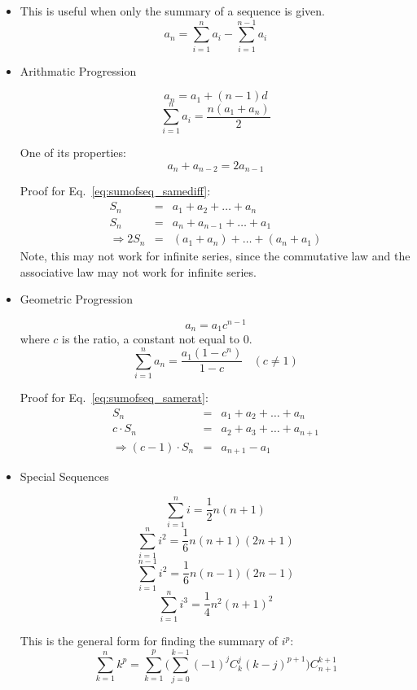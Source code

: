  \begin{itemize}
 \item This is useful when only the summary of a sequence is given.
  \[ a_n = \sum_{i=1}^n a_i - \sum_{i=1}^{n-1} a_i \]

 \item{Arithmatic Progression}

  \[ a_n = a_1 + (n-1) d \]
  \begin{equation}
  \sum_{i=1}^n a_i = \frac{n(a_1+a_n)}{2}
  \label{eq:sumofseq_samediff}
  \end{equation}

  One of its properties:
  \[ a_{n} + a_{n-2} = 2 a_{n-1} \]

  Proof for Eq.~\ref{eq:sumofseq_samediff}:
  \begin{eqnarray}
                S_n & = & a_1 + a_2 + \ldots + a_n \\
                S_n & = & a_n + a_{n-1} + \ldots + a_1 \\
  \Rightarrow 2 S_n & = & (a_1 + a_n) + \ldots + (a_n + a_1)
  \end{eqnarray}
  Note, this may not work for infinite series, since
  the commutative law and the associative law may not
  work for infinite series.
 
 \item{Geometric Progression}

 \[ a_n = a_1 c^{n-1} \]
 where $c$ is the ratio, a constant not equal to $0$.
 \begin{equation}
 \sum_{i=1}^n a_n = \frac{a_1 (1-c^n)}{1-c} ~~~~(c\neq1)
 \label{eq:sumofseq_samerat}
 \end{equation}

 Proof for Eq.~\ref{eq:sumofseq_samerat}:
 \begin{eqnarray}
                        S_n & = & a_1 + a_2 + \ldots + a_n \\
                c \cdot S_n & = & a_2 + a_3 + \ldots + a_{n+1} \\
 \Rightarrow (c-1)\cdot S_n & = & a_{n+1} - a_1
 \end{eqnarray}

 \item{Special Sequences}

 \[ \sum^n_{i=1} i = \frac{1}{2} n(n+1) \]
 \[ \sum^n_{i=1} i^2 = \frac{1}{6} n(n+1)(2n+1) \]
 \[ \sum^{n-1}_{i=1} i^2 = \frac{1}{6} n(n-1)(2n-1) \]
 \[ \sum^n_{i=1} i^3 = \frac{1}{4} n^2(n+1)^2 \]

 This is the general form for finding the summary of $i^p$:
 \[ \sum_{k=1}^n k^p = \sum_{k=1}^p \Big( \sum_{j=0}^{k-1} (-1)^j C_k^j (k-j)^{p+1} \Big) C_{n+1}^{k+1} \]

 \end{itemize}

